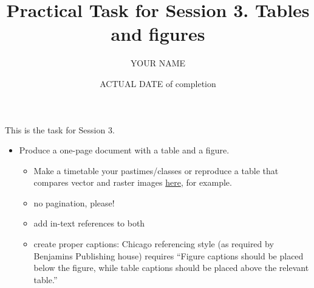 \documentclass[a4paper,11pt]{article}
\title{Practical Task for Session 3. Tables and figures}
\author{YOUR NAME}
\date{ACTUAL DATE of completion}
\begin{document}
	
	\maketitle

This is the task for Session 3. 
		\begin{itemize}
		\item Produce a one-page document with a table and a figure.
		\begin{itemize}
			\item Make a timetable your pastimes/classes or reproduce a table that compares vector and raster images \href{https://tinyurl.com/yf8orxog}{here}, for example.
			\item no pagination, please!
			\item add in-text references to both
			\item create proper captions: Chicago referencing style (as required by Benjamins Publishing house) requires ``Figure captions should be placed below the figure, while table captions should be placed above the relevant table.'' 
		\end{itemize} 
	\end{itemize}
	
\end{document}
